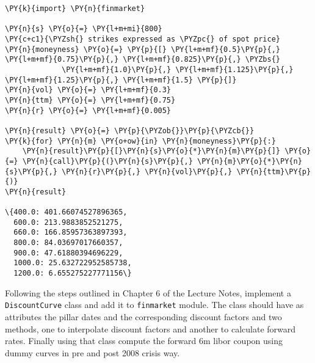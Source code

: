 \begin{Answer}
\begin{tcolorbox}[size=fbox, boxrule=1pt, colback=cellbackground, colframe=cellborder]
\begin{Verbatim}[commandchars=\\\{\}]
\PY{k}{import} \PY{n}{finmarket}
        
\PY{n}{s} \PY{o}{=} \PY{l+m+mi}{800}
\PY{c+c1}{\PYZsh{} strikes expressed as \PYZpc{} of spot price}
\PY{n}{moneyness} \PY{o}{=} \PY{p}{[} \PY{l+m+mf}{0.5}\PY{p}{,} \PY{l+m+mf}{0.75}\PY{p}{,} \PY{l+m+mf}{0.825}\PY{p}{,} \PYZbs{}
             \PY{l+m+mf}{1.0}\PY{p}{,} \PY{l+m+mf}{1.125}\PY{p}{,} \PY{l+m+mf}{1.25}\PY{p}{,} \PY{l+m+mf}{1.5} \PY{p}{]}
\PY{n}{vol} \PY{o}{=} \PY{l+m+mf}{0.3}
\PY{n}{ttm} \PY{o}{=} \PY{l+m+mf}{0.75}
\PY{n}{r} \PY{o}{=} \PY{l+m+mf}{0.005}

\PY{n}{result} \PY{o}{=} \PY{p}{\PYZob{}}\PY{p}{\PYZcb{}}
\PY{k}{for} \PY{n}{m} \PY{o+ow}{in} \PY{n}{moneyness}\PY{p}{:}
    \PY{n}{result}\PY{p}{[}\PY{n}{s}\PY{o}{*}\PY{n}{m}\PY{p}{]} \PY{o}{=} \PY{n}{call}\PY{p}{(}\PY{n}{s}\PY{p}{,} \PY{n}{m}\PY{o}{*}\PY{n}{s}\PY{p}{,} \PY{n}{r}\PY{p}{,} \PY{n}{vol}\PY{p}{,} \PY{n}{ttm}\PY{p}{)}
\PY{n}{result}

\{400.0: 401.66074527896365,
  600.0: 213.9883852521275,
  660.0: 166.85957363897393,
  800.0: 84.03697017660357,
  900.0: 47.61880394696229,
  1000.0: 25.632722952585738,
  1200.0: 6.655275227771156\}
\end{Verbatim}
\end{tcolorbox}
\end{Answer}

\begin{Exercise}
  Following the steps outlined in Chapter 6 of the Lecture Notes, implement a \texttt{DiscountCurve} class and add it to \texttt{finmarket} module. The class should have as attributes the pillar dates and the corresponding discount factors and two methods, one to interpolate discount factors and another to calculate forward rates.
  Finally using that class compute the forward 6m libor coupon using dummy curves in pre and post 2008 crisis way.
\end{Exercise}

